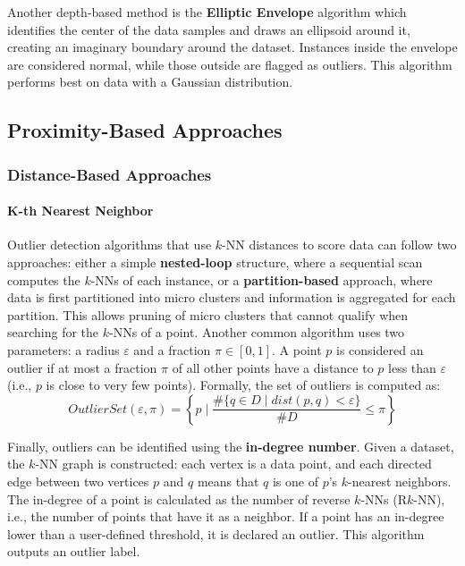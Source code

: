 Another depth-based method is the \textbf{Elliptic Envelope} algorithm which identifies the center of the data samples and draws an ellipsoid around it, creating an imaginary boundary around the dataset. Instances inside the envelope are considered normal, while those outside are flagged as outliers. This algorithm performs best on data with a Gaussian distribution.

\subsection{Proximity-Based Approaches}
\subsubsection{Distance-Based Approaches}
\paragraph{K-th Nearest Neighbor}
Outlier detection algorithms that use \( k \)-NN distances to score data can follow two approaches: either a simple \textbf{nested-loop} structure, where a sequential scan computes the \( k \)-NNs of each instance, or a \textbf{partition-based} approach, where data is first partitioned into micro clusters and information is aggregated for each partition. This allows pruning of micro clusters that cannot qualify when searching for the \( k \)-NNs of a point. Another common algorithm uses two parameters: a radius \( \varepsilon \) and a fraction \( \pi \in [0,1] \). A point \( p \) is considered an outlier if at most a fraction \( \pi \) of all other points have a distance to \( p \) less than \( \varepsilon \) (i.e., \( p \) is close to very few points). Formally, the set of outliers is computed as:
\begin{equation}
    \textit{OutlierSet}(\varepsilon, \pi) = \left\{ p \mid \dfrac{\#\{q \in D \mid \textit{dist}(p,q) < \varepsilon \}}{\# D} \leq \pi \right\}
\end{equation}

Finally, outliers can be identified using the \textbf{in-degree number}. Given a dataset, the \( k \)-NN graph is constructed: each vertex is a data point, and each directed edge between two vertices \( p \) and \( q \) means that \( q \) is one of \( p \)'s \( k \)-nearest neighbors. The in-degree of a point is calculated as the number of reverse \( k \)-NNs (R$k$-NN), i.e., the number of points that have it as a neighbor. If a point has an in-degree lower than a user-defined threshold, it is declared an outlier. This algorithm outputs an outlier label.

